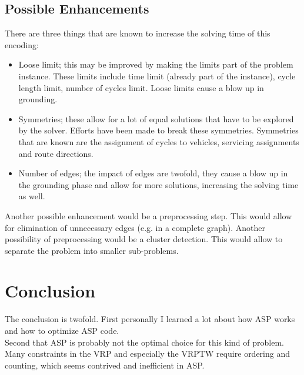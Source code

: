 \documentclass[12pt, letterpaper]{article}
\begin{document}
\subsection{Possible Enhancements}
There are three things that are known to increase the solving time of this encoding:
\begin{itemize}
	\item Loose limit; this may be improved by making the limits part of the problem instance. These limits include time limit (already part of the instance), cycle length limit, number of cycles limit. Loose limits cause a blow up in grounding.
	\item Symmetries; these allow for a lot of equal solutions that have to be explored by the solver. Efforts have been made to break these symmetries. Symmetries that are known are the assignment of cycles to vehicles, servicing assignments and route directions.
	\item Number of edges; the impact of edges are twofold, they cause a blow up in the grounding phase and allow for more solutions, increasing the solving time as well.
\end{itemize}

Another possible enhancement would be a preprocessing step. This would allow for elimination of unnecessary edges (e.g. in a complete graph). Another possibility of preprocessing would be a cluster detection. This would allow to separate the problem into smaller sub-problems.

\section{Conclusion}
The conclusion is twofold. First personally I learned a lot about how ASP works and how to optimize ASP code.\\
Second that ASP is probably not the optimal choice for this kind of problem. Many constraints in the VRP and especially the VRPTW require ordering and counting, which seems contrived and inefficient in ASP.



\end{document}
